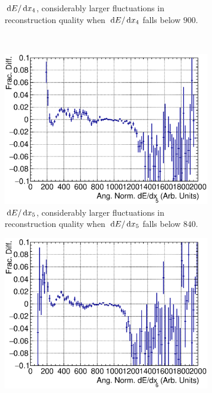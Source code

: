 \begin{figure}[ht]
\begin{subfigure}{\dbfigwid\textwidth}
           \caption{$\,\textrm{d}E/\,\textrm{d}x_4$, considerably larger fluctuations in reconstruction quality when $\,\textrm{d}E/\,\textrm{d}x_4$ falls below $900$.}
           \label{subfig:dedx3}
      \end{subfigure}
      \\
      \begin{subfigure}{\dbfigwid\textwidth}
           \includegraphics[width=\textwidth]{figures/sel/fig53e.eps}
           \caption{$\,\textrm{d}E/\,\textrm{d}x_5$, considerably larger fluctuations in reconstruction quality when $\,\textrm{d}E/\,\textrm{d}x_5$ falls below $840$.}
           \label{subfig:dedx4}
      \end{subfigure}
      \begin{subfigure}{\dbfigwid\textwidth}
           \includegraphics[width=\textwidth]{figures/sel/fig53f.eps}

\end{subfigure}
\end{figure}
